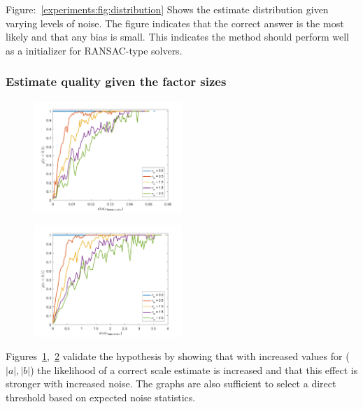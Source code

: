 Figure:~\ref{experiments:fig:distribution} Shows the estimate distribution given varying levels of noise. The figure indicates that the correct answer is the most likely and that any bias is small. This indicates the method should perform well as a initializer for RANSAC-type solvers. 

\subsubsection{Estimate quality given the factor sizes}
\begin{figure}[t]
	\centering
	\includegraphics[width=0.5\textwidth]{images/err_prob_denominator_est_e.pdf}
	\caption{}
	\label{experiments:fig:err_prob_denominator}
\end{figure}

\begin{figure}[t]
	\centering
	\includegraphics[width=0.5\textwidth]{images/err_prob_numerator_est_e.pdf}
	\caption{}
	\label{experiments:fig:err_prob_numerator}
\end{figure}
Figures~\ref{experiments:fig:err_prob_denominator},~\ref{experiments:fig:err_prob_numerator} validate the hypothesis by showing that with increased values for ($|a|,|b|$) the likelihood of a correct scale estimate is increased and that this effect is stronger with increased noise. The graphs are also sufficient to select a direct threshold based on expected noise statistics. 

